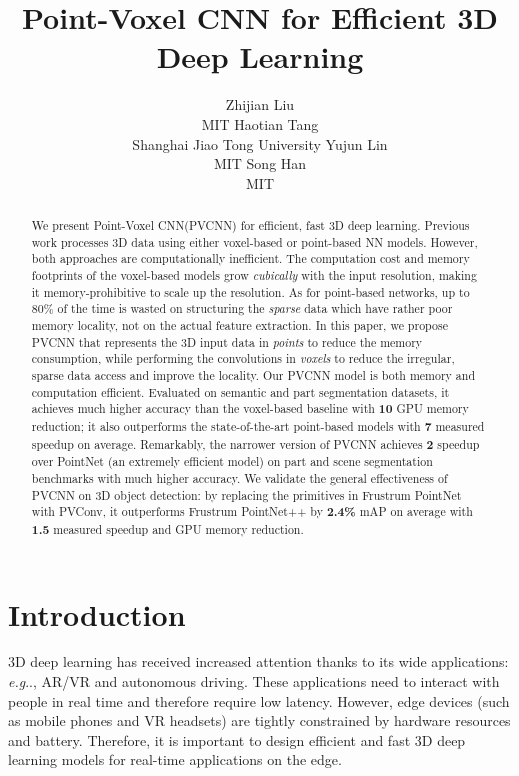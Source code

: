 \documentclass{article}
\title{Point-Voxel CNN for Efficient 3D Deep Learning}
\author{Zhijian Liu\\
MIT
\And
Haotian Tang\\
Shanghai Jiao Tong University
\And
Yujun Lin\\
MIT
\And
Song Han\\
MIT
}
\makeatletter
\DeclareRobustCommand\onedot{\futurelet\@let@token\@onedot}
\def\@onedot{\ifx\@let@token.\else.\null\fi\xspace}
\def\eg{\emph{e.g}\onedot} \def\Eg{\emph{E.g}\onedot}
\def\model{Point-Voxel CNN\xspace}
\def\modelshort{PVCNN\xspace}
\def\convshort{PVConv\xspace}
\makeatother
\begin{document}
\maketitle


\begin{abstract}

We present \model (\modelshort) for efficient, fast 3D deep learning. Previous work processes 3D data using either voxel-based or point-based NN models. However, both approaches are computationally inefficient. The computation cost and memory footprints of the voxel-based models grow \textit{cubically} with the input resolution, making it memory-prohibitive to scale up the resolution. As for point-based networks, up to 80\% of the time is wasted on structuring the \textit{sparse} data which have rather poor memory locality, not on the actual feature extraction. In this paper, we propose \modelshort that represents the 3D input data in \textit{points} to reduce the memory consumption, while performing the convolutions in \textit{voxels} to reduce the irregular, sparse data access and improve the locality. Our \modelshort model is both memory and computation efficient. Evaluated on semantic and part segmentation datasets, it achieves much higher accuracy than the voxel-based baseline with \textbf{10} GPU memory reduction; it also outperforms the state-of-the-art point-based models with \textbf{7} measured speedup on average. Remarkably, the narrower version of \modelshort achieves \textbf{2} speedup over PointNet (an extremely efficient model) on part and scene segmentation benchmarks with much higher accuracy. We validate the general effectiveness of \modelshort on 3D object detection: by replacing the primitives in Frustrum PointNet with \convshort, it outperforms Frustrum PointNet++ by \textbf{2.4\%} mAP on average with \textbf{1.5} measured speedup and GPU memory reduction.

\end{abstract} \section{Introduction}
\label{sec:intro}

3D deep learning has received increased attention thanks to its wide applications: \eg, AR/VR and autonomous driving. These applications need to interact with people in real time and therefore require low latency. However, edge devices (such as mobile phones and VR headsets) are tightly constrained by hardware resources and battery. Therefore, it is important to design efficient and fast 3D deep learning models for real-time applications on the edge.
\end{document}
